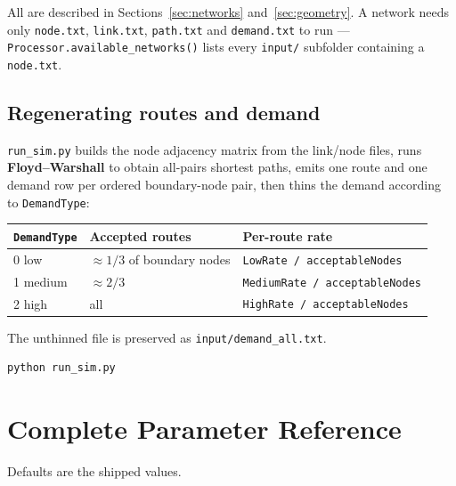 \documentclass[11pt, a4paper]{article}
\newcommand{\code}[1]{\texttt{#1}}
\begin{document}
All are described in Sections~\ref{sec:networks} and~\ref{sec:geometry}. A
network needs only \code{node.txt}, \code{link.txt}, \code{path.txt} and
\code{demand.txt} to run --- \code{Processor.available\_networks()} lists every
\code{input/} subfolder containing a \code{node.txt}.

\subsection{Regenerating routes and demand}

\code{run\_sim.py} builds the node adjacency matrix from the link/node files,
runs \textbf{Floyd--Warshall} to obtain all-pairs shortest paths, emits one route
and one demand row per ordered boundary-node pair, then thins the demand
according to \code{DemandType}:

\begin{center}
\begin{tabular}{l l l}
\toprule
\textbf{\code{DemandType}} & \textbf{Accepted routes} & \textbf{Per-route rate} \\
\midrule
0 low    & $\approx 1/3$ of boundary nodes & \code{LowRate / acceptableNodes} \\
1 medium & $\approx 2/3$                   & \code{MediumRate / acceptableNodes} \\
2 high   & all                             & \code{HighRate / acceptableNodes} \\
\bottomrule
\end{tabular}
\end{center}

The unthinned file is preserved as \code{input/demand\_all.txt}.

\begin{lstlisting}[language=bash]
python run_sim.py
\end{lstlisting}

\section{Complete Parameter Reference}
\label{sec:params}

Defaults are the shipped values.
\end{document}
